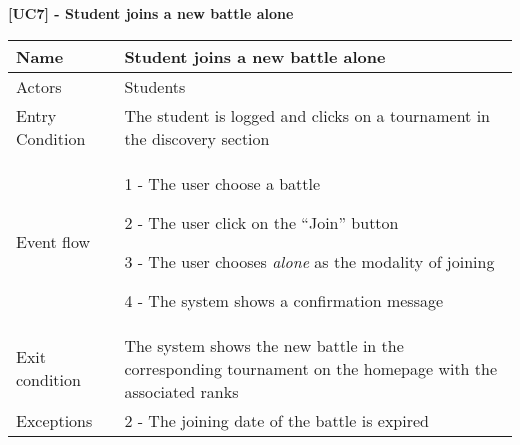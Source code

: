     \begin{table}[h]

    
    \textbf{[UC7] - Student joins a new battle alone}
    
      \centering
      \begin{tabular}{|p{3cm}|p{14cm}|}

      
        \hline
        Name & Student joins a new battle alone \\
        \hline
        Actors & Students \\
        \hline
        Entry Condition & The student is logged and clicks on a tournament in the discovery section \\
        \hline
        Event flow &  1 - The user choose a battle
        
        2 - The user click on the ``Join'' button

        3 - The user chooses \textit{alone} as the modality of joining

        4 - The system shows a confirmation message
        \\
        \hline
        Exit condition & The system shows the new battle in the corresponding tournament on the homepage with the associated ranks \\
        \hline
        Exceptions & 2 - The joining date of the battle is expired  
        \\
        \hline
      \end{tabular}
    \end{table}

